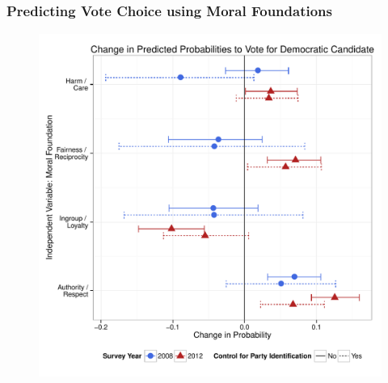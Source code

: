 \documentclass{beamer}
\begin{document}
\subsection{}
\begin{frame}%
  \frametitle{Predicting Vote Choice using Moral Foundations}
  \begin{figure}[ht]\centering
    \includegraphics[height=.9\textheight]{../calc/fig/m2_vote}
  \end{figure}
\end{frame}
\end{document}
